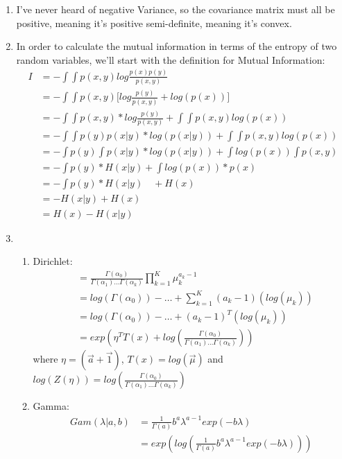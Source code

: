 \documentclass[11pt,a4paper]{article}
\begin{document}
\begin{enumerate}
			\item I've never heard of negative Variance, so the covariance matrix must all be positive, meaning it's positive semi-definite, meaning it's convex.
			\item In order to calculate the mutual information in terms of the entropy of two random variables, we'll start with the definition for Mutual Information:
			\begin{align*}
				I &= -\int \int p(x,y) log \frac{p(x)p(y)}{p(x,y)} \\
				&= -\int \int p(x,y) \Big[ log \frac{p(y)}{p(x,y)} + log(p(x)) \Big] \\
				&= -\int \int p(x,y) * log \frac{p(y)}{p(x,y)} + \int \int p(x,y) log(p(x)) \\
				&= -\int \int p(y) p(x|y) * log (p(x|y)) + \int \int p(x,y) log(p(x)) \\
				&= -\int p(y) \int p(x|y) * log (p(x|y)) + \int log(p(x)) \int p(x,y)  \\
				&= -\int p(y) * H(x|y) + \int log(p(x)) * p(x)  \\
				&= -\int p(y) * H(x|y) \quad  + H(x)  \\
				&= -H(x|y) + H(x)  \\
				&= H(x) - H(x|y)
			\end{align*}
			\item 
			\begin{enumerate}
				\item Dirichlet: \\
				\begin{align*}
					&= \frac{\Gamma(\alpha_0)}{\Gamma(\alpha_1)\dots \Gamma(\alpha_k)}	\prod_{k=1}^K \mu_k^{a_k-1}	\\
					&= log(\Gamma(\alpha_0)) -\dots + \sum_{k=1}^K (a_k -1)(log(\mu_k)) \\
					&= log(\Gamma(\alpha_0)) -\dots + (a_k -1)^T(log(\mu_k)) \\
					&= exp(\eta^T T(x) + log(\frac{\Gamma(\alpha_0)}{\Gamma(\alpha_1)\dots \Gamma(\alpha_k)}))
				\end{align*}
				where $\eta = (\vec{a}+\vec{1})$, $T(x) = log(\vec{\mu})$ and $log(Z(\eta)) = log(\frac{\Gamma(\alpha_0)}{\Gamma(\alpha_1)\dots \Gamma(\alpha_k)})$
				\item Gamma: \\
				\begin{align*}
					Gam(\lambda |a,b) &= \frac{1}{\Gamma(a)}b^a\lambda^{a-1}exp(-b\lambda) \\
					&= exp(log(\frac{1}{\Gamma(a)}b^a\lambda^{a-1}exp(-b\lambda)))

\end{align*}
\end{enumerate}
\end{enumerate}
\end{document}
